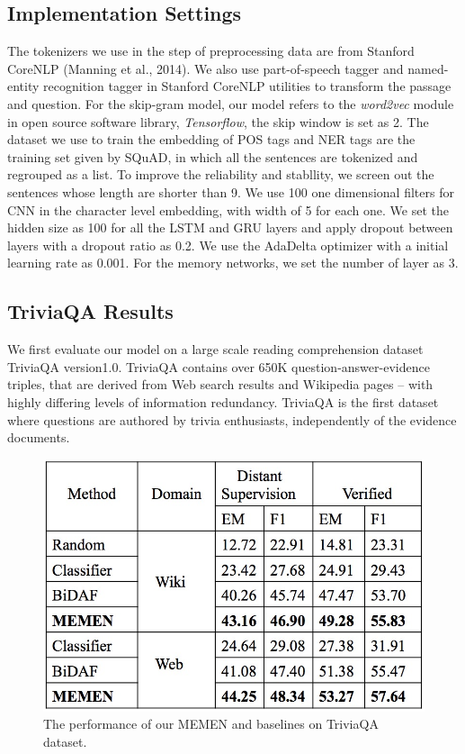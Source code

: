\documentclass[letterpaper]{article}
\begin{document}
\subsection{Implementation Settings}
The tokenizers we use in the step of preprocessing data are from Stanford CoreNLP (Manning et al., 2014). We also use part-of-speech tagger and named-entity recognition tagger in Stanford CoreNLP utilities to transform the passage and question. For the skip-gram model, our model refers to the \emph{word2vec} module in open source software library, \emph{Tensorflow}, the skip window is set as 2. The dataset we use to train the embedding of POS tags and NER tags are the training set given by SQuAD, in which all the sentences are tokenized and regrouped as a list. To improve the reliability and stabllity, we screen out the sentences whose length are shorter than 9. We use 100 one dimensional filters for CNN in the character level embedding, with width of 5 for each one. We set the hidden size as 100 for all the LSTM and GRU layers and apply dropout\citep{srivastava2014dropout} between layers with a dropout ratio as 0.2. We use the AdaDelta \citep{zeiler2012adadelta} optimizer with a initial learning rate as 0.001. For the memory networks, we set the number of layer as 3. 


 \subsection{TriviaQA Results}
We first evaluate our model on a large scale reading comprehension dataset TriviaQA version1.0\citep{joshi2017triviaqa}. TriviaQA contains over 650K question-answer-evidence triples, that are derived from Web search results and Wikipedia pages – with highly differing levels of information redundancy. TriviaQA is the first dataset where questions are authored by trivia enthusiasts, independently of the evidence documents. 

\begin{figure}[htbp]
  \begin{center}
  \includegraphics[width=0.4 \textwidth]{performance_triviaqa.jpg}
  \caption{The performance of our MEMEN and baselines on TriviaQA dataset.}
  \end{center}
\end{figure}
\end{document}
